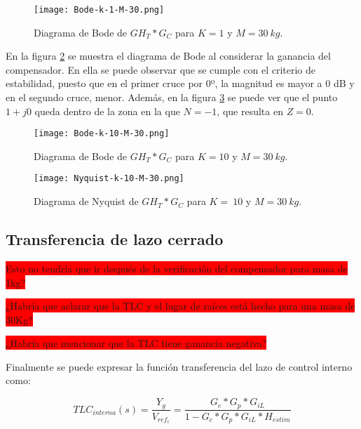\begin{figure}[H]
	\centering
	\texttt{[image: Bode-k-1-M-30.png]}
	\caption{Diagrama de Bode de $GH_T*G_C$ para $K=1$ y $M=30\:kg$.}
	\label{fig:bode-analog-compensado-para-k-1}
\end{figure}

\noindent En la figura \ref{fig:bode-analog-compensado-para-k-10} se muestra el diagrama de Bode al considerar la ganancia del compensador. En ella se puede observar que se  cumple con el criterio de estabilidad, puesto que en el primer cruce por 0º, la magnitud es mayor a 0 dB y en el segundo cruce, menor. Además, en la figura \ref{fig:nyquist-analog-para-k-10} se puede ver que el punto $1+j0$ queda dentro de la zona en la que $N=-1$, que resulta en $Z=0$.

\begin{figure}[H]
	\centering
	\texttt{[image: Bode-k-10-M-30.png]}
	\caption{Diagrama de Bode de $GH_{T}*G_C$ para $K=10$ y $M=30\:kg$.}
	\label{fig:bode-analog-compensado-para-k-10}
\end{figure}

\begin{figure}[H]
	\centering
	\texttt{[image: Nyquist-k-10-M-30.png]}
	\caption{Diagrama de Nyquist de $GH_T*G_C$ para $K=\:10$ y $M=30\:kg$.}
	\label{fig:nyquist-analog-para-k-10}
\end{figure}

\subsection{Transferencia de lazo cerrado}
\colorbox{red}{Esto no tendría que ir después de la verificación del compensador para masa de 1kg?}


\colorbox{red}{¿Habría que aclarar que la TLC y el lugar de raíces está hecho para una masa de 30Kg?}

\colorbox{red}{¿Habría que mencionar que la TLC tiene ganancia negativa?}


Finalmente se puede expresar la función transferencia del lazo de control interno como:
%


\begin{equation}
	TLC_{interna}(s)=\frac{Y_g}{V_{ref_c}}=\frac{G_c*G_{p}*G_{iL}}{1-G_c*G_{p}*G_{iL}*H_{estim}}
\end{equation}

